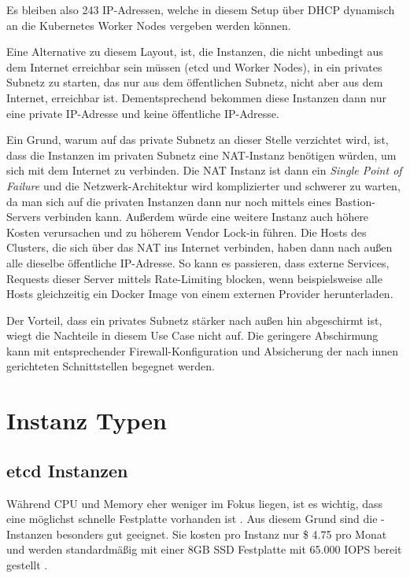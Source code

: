 Es bleiben also 243 IP-Adressen, welche in diesem Setup über DHCP dynamisch
an die Kubernetes Worker Nodes vergeben werden können.

Eine Alternative zu diesem Layout, ist, die Instanzen, die nicht unbedingt
aus dem Internet erreichbar sein müssen (etcd und Worker Nodes), in ein privates
Subnetz zu starten,
das nur aus dem \"offentlichen Subnetz, nicht aber aus dem Internet, erreichbar
ist.
Dementsprechend bekommen diese Instanzen dann nur eine private IP-Adresse und
keine
\"offentliche IP-Adresse.

Ein Grund, warum auf das private Subnetz an dieser Stelle verzichtet wird,
ist, dass die Instanzen im privaten Subnetz eine NAT-Instanz benötigen würden,
um sich mit dem Internet zu verbinden.
Die NAT Instanz ist dann ein \emph{Single Point of Failure} und die
Netzwerk-Architektur
wird komplizierter und schwerer zu warten, da man sich auf die privaten
Instanzen dann nur noch
mittels eines Bastion-Servers verbinden kann.
Außerdem würde eine weitere Instanz auch höhere Kosten verursachen und zu
höherem Vendor Lock-in führen.
Die Hosts des Clusters, die sich über das NAT ins Internet verbinden,
haben dann nach außen alle dieselbe \"offentliche IP-Adresse.
So kann es passieren, dass externe Services, Requests dieser Server
mittels Rate-Limiting blocken, wenn beispielsweise alle Hosts gleichzeitig ein
Docker Image von einem externen Provider herunterladen.

Der Vorteil, dass ein privates Subnetz stärker nach außen hin abgeschirmt ist,
wiegt die Nachteile in diesem Use Case nicht auf.
Die geringere Abschirmung kann mit entsprechender Firewall-Konfiguration und
Absicherung der nach innen gerichteten Schnittstellen begegnet werden.

\section{Instanz Typen}

\subsection{etcd Instanzen}
Während CPU und Memory eher weniger im Fokus liegen,
ist es wichtig, dass eine möglichst schnelle Festplatte vorhanden ist
\cite{etcdhardware}.
Aus diesem Grund sind die -Instanzen besonders gut geeignet.
Sie kosten pro Instanz nur \$ 4.75 pro Monat und werden standardmäßig mit einer
8GB SSD Festplatte mit 65.000 IOPS bereit gestellt \cite{AwsEbs}.

